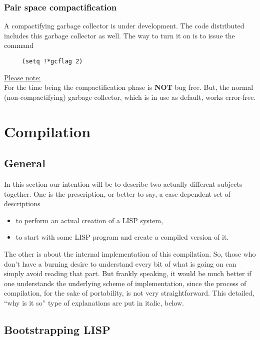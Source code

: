 \begin{description}
\subsection{Pair space compactification}
A compactifying garbage collector is under development. The code
distributed includes this garbage collector as well. The way to
turn it on is to issue the command
\begin{verbatim}
     (setq !*gcflag 2)
\end{verbatim}
\underline{Please note:} \\
For the time being the compactification phase is {\bf NOT} bug free.
But, the normal (non-compactifying) garbage collector, which is in use as
default, works error-free.
\end{description}

\chapter{Compilation}

\section{General}

In  this  section  our intention will be to describe two actually different
subjects together.
 One is the prescription, or better to say, a case dependent set
of descriptions
\begin{itemize}
  \item
        to perform an actual creation of a LISP system,
  \item
        to start with some LISP program and create a  compiled  version  of
        it.
\end{itemize}
The other  is about the internal implementation of this compilation.
So, those who don't have a burning desire to understand every bit of what is
going on can simply avoid reading that part. But frankly speaking, it would
be much better if one understands the underlying scheme of  implementation,
since  the process of compilation, for the sake of portability, is not very
straightforward. This detailed, ``why is it so'' type of explanations are put
in italic, below.

\section{Bootstrapping LISP}

